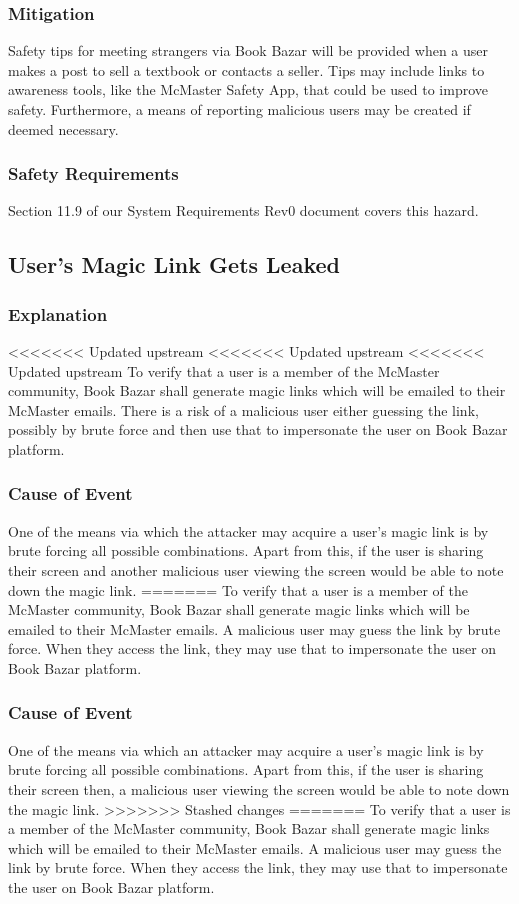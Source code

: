 \documentclass[fullpage]{article}
\begin{document}
\subsubsection*{Mitigation}
Safety tips for meeting strangers via Book Bazar will be provided when a user makes a post to sell a textbook or contacts a seller. Tips may include links to awareness tools, like the McMaster Safety App, that could be used to improve safety. Furthermore, a means of reporting malicious users may be created if deemed necessary.

\subsubsection*{Safety Requirements}
Section 11.9 of our System Requirements Rev0 document covers this hazard.

\subsection{User's Magic Link Gets Leaked}


\subsubsection*{Explanation}
<<<<<<< Updated upstream
<<<<<<< Updated upstream
<<<<<<< Updated upstream
To verify that a user is a member of the McMaster community, Book Bazar shall generate magic links which will be emailed to their McMaster emails. There is a risk of a malicious user either guessing the link, possibly by brute force and then use that to impersonate the user on Book Bazar platform. 
\subsubsection*{Cause of Event}
One of the means via which the attacker may acquire a user's magic link is by brute forcing all possible combinations. Apart from this, if the user is sharing their screen and another malicious user viewing the screen would be able to note down the magic link.
=======
To verify that a user is a member of the McMaster community, Book Bazar shall generate magic links which will be emailed to their McMaster emails. A malicious user may guess the link by brute force. When they access the link, they may use that to impersonate the user on Book Bazar platform. 
\subsubsection*{Cause of Event}
One of the means via which an attacker may acquire a user's magic link is by brute forcing all possible combinations. Apart from this, if the user is sharing their screen then, a malicious user viewing the screen would be able to note down the magic link.
>>>>>>> Stashed changes
=======
To verify that a user is a member of the McMaster community, Book Bazar shall generate magic links which will be emailed to their McMaster emails. A malicious user may guess the link by brute force. When they access the link, they may use that to impersonate the user on Book Bazar platform. 
\end{document}
